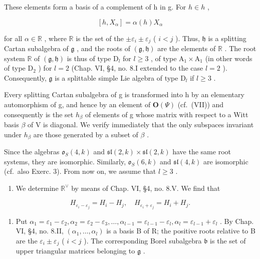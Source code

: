 These elements form a basis of a complement of h in g. For \(h \in h\) ,

\[
[ h, X _ {\alpha} ] = \alpha (h) X _ {\alpha}
\]

for all \(\alpha \in \mathbb{R}\) , where \(\mathbb{R}\) is the set of the \(\pm \varepsilon_i \pm \varepsilon_j\) ( \(i < j\) ). Thus, \(\mathfrak{h}\) is a splitting Cartan subalgebra of \(\mathfrak{g}\) , and the roots of \((\mathfrak{g}, \mathfrak{h})\) are the elements of \(\mathbb{R}\) . The root system \(\mathbb{R}\) of \((\mathfrak{g}, \mathfrak{h})\) is thus of type \(\mathrm{D}_l\) for \(l \geq 3\) , of type \(\mathrm{A}_1 \times \mathrm{A}_1\) (in other words of type \(\mathrm{D}_2\) ) for \(l = 2\) (Chap. VI, §4, no. 8.I extended to the case \(l = 2\) ). Consequently, \(\mathfrak{g}\) is a splittable simple Lie algebra of type \(\mathrm{D}_l\) if \(l \geq 3\) .

Every splitting Cartan subalgebra of g is transformed into h by an elementary automorphism of g, and hence by an element of \(\mathbf{O}(\varPsi)\) (cf.~(VII)) and consequently is the set \(h_{\beta}\) of elements of g whose matrix with respect to a Witt basis \(\beta\) of V is diagonal. We verify immediately that the only subspaces invariant under \(h_{\beta}\) are those generated by a subset of \(\beta\) .

Since the algebras \(\mathfrak{o}_{S}(4,k)\) and \(\mathfrak{sl}(2,k)\times\mathfrak{sl}(2,k)\) have the same root systems, they are isomorphic. Similarly, \(\mathfrak{o}_{S}(6,k)\) and \(\mathfrak{sl}(4,k)\) are isomorphic (cf.~also Exerc. 3). From now on, we assume that \(l\geq3\) .

\begin{enumerate}
\def\labelenumi{(\Roman{enumi})}
\setcounter{enumi}{1}
\tightlist
\item
  We determine \(\mathbb{R}^{\vee}\) by means of Chap. VI, §4, no. 8.V. We find that
\end{enumerate}

\[
H _ {\varepsilon_ {i} - \varepsilon_ {j}} = H _ {i} - H _ {j}, \quad H _ {\varepsilon_ {i} + \varepsilon_ {j}} = H _ {i} + H _ {j}.
\]

\begin{enumerate}
\def\labelenumi{(\Roman{enumi})}
\setcounter{enumi}{2}
\tightlist
\item
  Put \(\alpha_{1} = \varepsilon_{1} - \varepsilon_{2},\alpha_{2} = \varepsilon_{2} - \varepsilon_{3},\ldots ,\alpha_{l - 1} = \varepsilon_{l - 1} - \varepsilon_{l},\alpha_{l} = \varepsilon_{l - 1} + \varepsilon_{l}\) . By Chap. VI, §4, no. 8.II, \((\alpha_{1},\dots,\alpha_{l})\) is a basis B of R; the positive roots relative to B are the \(\varepsilon_i\pm \varepsilon_j\) ( \(i < j\) ). The corresponding Borel subalgebra \(\mathfrak{b}\) is the set of upper triangular matrices belonging to \(\mathfrak{g}\) .
\end{enumerate}

